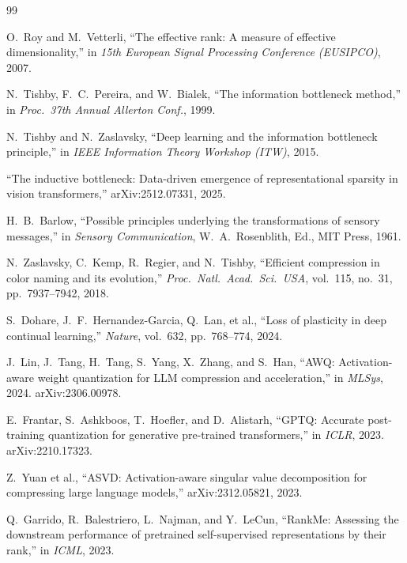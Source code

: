 \documentclass[11pt]{article}
\begin{document}
\begin{thebibliography}{99}

O.~Roy and M.~Vetterli, ``The effective rank: A measure of effective dimensionality,'' in \emph{15th European Signal Processing Conference (EUSIPCO)}, 2007.

N.~Tishby, F.~C.~Pereira, and W.~Bialek, ``The information bottleneck method,'' in \emph{Proc.\ 37th Annual Allerton Conf.}, 1999.

N.~Tishby and N.~Zaslavsky, ``Deep learning and the information bottleneck principle,'' in \emph{IEEE Information Theory Workshop (ITW)}, 2015.

``The inductive bottleneck: Data-driven emergence of representational sparsity in vision transformers,'' arXiv:2512.07331, 2025.

H.~B.~Barlow, ``Possible principles underlying the transformations of sensory messages,'' in \emph{Sensory Communication}, W.~A.~Rosenblith, Ed., MIT Press, 1961.

N.~Zaslavsky, C.~Kemp, R.~Regier, and N.~Tishby, ``Efficient compression in color naming and its evolution,'' \emph{Proc.\ Natl.\ Acad.\ Sci.\ USA}, vol.~115, no.~31, pp.~7937--7942, 2018.

S.~Dohare, J.~F.~Hernandez-Garcia, Q.~Lan, et al., ``Loss of plasticity in deep continual learning,'' \emph{Nature}, vol.~632, pp.~768--774, 2024.

J.~Lin, J.~Tang, H.~Tang, S.~Yang, X.~Zhang, and S.~Han, ``AWQ: Activation-aware weight quantization for LLM compression and acceleration,'' in \emph{MLSys}, 2024. arXiv:2306.00978.

E.~Frantar, S.~Ashkboos, T.~Hoefler, and D.~Alistarh, ``GPTQ: Accurate post-training quantization for generative pre-trained transformers,'' in \emph{ICLR}, 2023. arXiv:2210.17323.

Z.~Yuan et al., ``ASVD: Activation-aware singular value decomposition for compressing large language models,'' arXiv:2312.05821, 2023.

Q.~Garrido, R.~Balestriero, L.~Najman, and Y.~LeCun, ``RankMe: Assessing the downstream performance of pretrained self-supervised representations by their rank,'' in \emph{ICML}, 2023.


\end{thebibliography}
\end{document}
